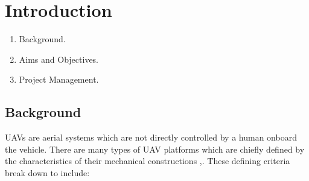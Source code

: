 \documentclass[12pt,a4paper,twoside]{report}
\begin{document}
	\newpage
	
	\tableofcontents
	
	\newpage
	
	\listoffigures
	
	\newpage
	
	\listoftables
	
	\newpage
	
	
	\chapter{Introduction}
		
		\begin{enumerate}
			\item
				Background.
			\item 
				Aims and Objectives. 
			\item 
				Project Management.
		\end{enumerate}

		\section{Background}
		
			UAVs are aerial systems which are not directly controlled by a human onboard the vehicle. There are many types of UAV platforms which are chiefly defined by the characteristics of their mechanical constructions \cite{3},\cite{4}. These defining criteria break down to include:
			
\end{document}
